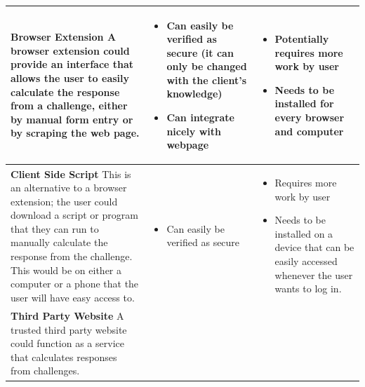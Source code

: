 \documentclass[11pt]{article}
\begin{document}
\begin{center}
\begin{tabular}{|  p{6cm} | p{5cm} | p{5cm} |}
    \\ \hline
    \vspace{.4cm}
    \textbf{Browser Extension}
    A browser extension could provide an interface that allows the user to easily calculate the response from a challenge, either by manual form entry or by scraping the web page.

    &
    \begin{itemize}[leftmargin=*]
    \item Can easily be verified as secure (it can only be changed with the client's knowledge)

    \item Can integrate nicely with webpage
    \end{itemize}
    &
    \begin{itemize}[leftmargin=*]
    \item Potentially requires more work by user

    \item Needs to be installed for every browser and computer
    \end{itemize}

    \\ \hline
    \vspace{.4cm}
    \textbf{Client Side Script}
    This is an alternative to a browser extension; the user could download a script or program that they can run to manually calculate the response from the challenge. This would be on either a computer or a phone that the user will have easy access to.

    &
    \begin{itemize}[leftmargin=*]
      \item Can easily be verified as secure
    \end{itemize}

    &
    
    \begin{itemize}[leftmargin=*]
    \item Requires more work by user
    \item Needs to be installed on a device that can be easily accessed whenever the user wants to log in.
    \end{itemize}        

    \\ \hline
    \vspace{.4cm}
    \textbf{Third Party Website}
    A trusted third party website could function as a service that calculates responses from challenges.
    \vspace{.4cm}
    &


\end{tabular}
\end{center}
\end{document}
